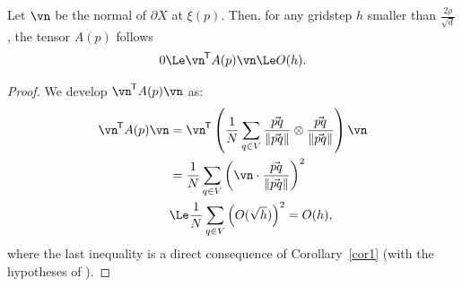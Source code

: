 \begin{lemma}
    \label{lem-nAn-le-h}
    Let $\vn$ be the normal of $\partial X$ at $\xi(p)$.
    Then, for any gridstep $h$
    smaller than $\frac{2\rho}{\sqrt{d}}$, the tensor $A(p)$ follows
    \begin{align*}
        0 \Le \TR{\vn} A(p) \vn \Le O(h).
    \end{align*}
\end{lemma}
\begin{proof}
    We develop $\TR{\vn} A(p) \vn$ as:
    \begin{align*}
        \TR{\vn} A(p) \vn & = \TR{\vn} \left( \frac{1}{N}\sum_{q \in V} \frac{\vec{pq}}{\| \vec{pq} \|} \otimes \frac{\vec{pq}}{\| \vec{pq} \|} \right) \vn \\
        & = \frac{1}{N} \sum_{q \in V} \left( \vn \cdot \frac{ \vec{p q} }{\|\vec{p q}\|} \right)^2\\
        & \Le \frac{1}{N} \sum_{q \in V} \left(O(\sqrt{h})\right)^2 = O(h),
    \end{align*}
    where the last inequality is a direct consequence of Corollary~\ref{cor1} (with the hypotheses of ).
\end{proof}


